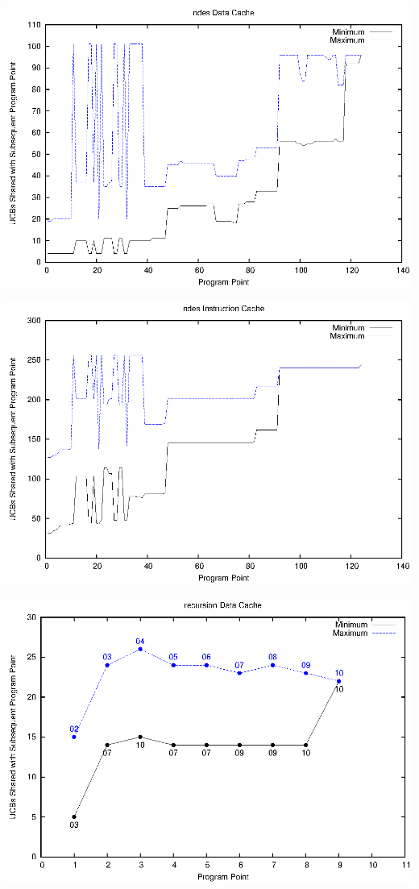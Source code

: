 \begin{center}
  \includegraphics[width=\linewidth]{eps/ndes-dcache.eps}
\end{center}

\begin{center}
  \includegraphics[width=\linewidth]{eps/ndes-icache.eps}
\end{center}

\begin{center}
  \includegraphics[width=\linewidth]{eps/recursion-dcache.eps}
\end{center}

